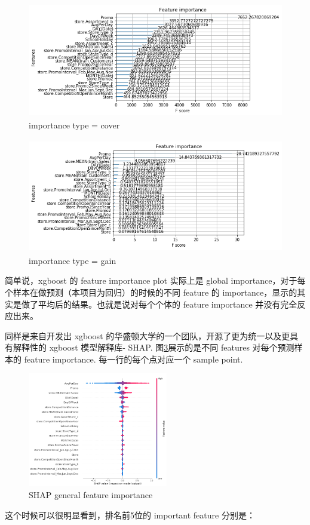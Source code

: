 \documentclass[a4paper]{article}
\begin{document}
\begin{figure}[ht]
 \centering
 \includegraphics[height=5cm,width=\textwidth]{images/cover}
 \caption{importance type = cover}
 \label{fig:cover}
\end{figure}

\begin{figure}[ht]
 \centering
 \includegraphics[height=5cm,width=\textwidth]{images/gain}
 \caption{importance type = gain}
 \label{fig:gain}
\end{figure}
简单说，xgboost 的 feature importance plot 实际上是 global importance，对于每个样本在做预测（本项目为回归）的时候的不同 feature 的 importance，显示的其实是做了平均后的结果。也就是说对每个个体的 feature importance 并没有完全反应出来。

同样是来自开发出 xgboost 的华盛顿大学的一个团队，开源了更为统一以及更具有解释性的 xgboost 模型解释库- SHAP.  图\ref{fig:shap-general}展示的是不同 features 对每个预测样本的 feature importance. 每一行的每个点对应一个 sample point. 
\begin{figure}[ht]
 \centering
 \includegraphics[height=5cm,width=\textwidth]{images/shap-general}
 \caption{SHAP general feature importance}
 \label{fig:shap-general}
\end{figure}
这个时候可以很明显看到，排名前5位的 important feature 分别是：
\end{document}
